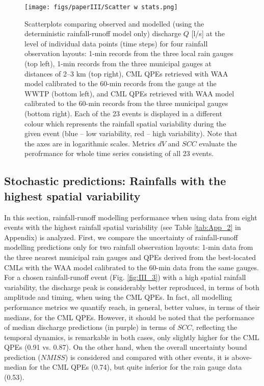 \documentclass{ctuthesis}\usepackage[]{graphicx}\usepackage[]{color}
\begin{document}
\begin{figure}[h]
\begin{center}
\texttt{[image: figs/paperIII/Scatter w stats.png]}
\caption{Scatterplots comparing observed and modelled (using the deterministic rainfall-runoff model only) discharge $Q$ [l/s] at the level of individual data points (time steps) for four rainfall observation layouts: 1-min records from the three local rain gauges (top left), 1-min records from the three municipal gauges at distances of 2--3 km (top right), CML QPEs retrieved with WAA model calibrated to the 60-min records from the gauge at the WWTP (bottom left), and CML QPEs retrieved with WAA model calibrated to the 60-min records from the three municipal gauges (bottom right). Each of the 23 events is displayed in a different colour which represents the rainfall spatial variability during the given event (blue – low variability, red – high variability). Note that the axes are in logarithmic scales. Metrics $dV$ and $SCC$ evaluate the perofrmance for whole time series consisting of all 23 events.} 
\label{fig:III_2}
\end{center}
\end{figure}

\FloatBarrier



\subsection{Stochastic predictions: Rainfalls with the highest spatial variability} \label{Summary_mostvar}

In this section, rainfall-runoff modelling performance when using data from eight events with the highest rainfall spatial variability (see Table \ref{tab:App_2} in Appendix) is analyzed. First, we compare the uncertainty of rainfall-runoff modelling predictions only for two rainfall observation layouts: 1-min data from the three nearest municipal rain gauges and QPEs derived from the best-located CMLs with the WAA model calibrated to the 60-min data from the same gauges. For a chosen rainfall-runoff event (Fig. \ref{fig:III_3}) with a high spatial rainfall variability, the discharge peak is considerably better reproduced, in terms of both amplitude and timing, when using the CML QPEs. In fact, all modelling performance metrics we quantify reach, in general, better values, in terms of their medians, for the CML QPEs. However, it should be noted that the performance of median discharge  predictions (in purple) in terms of $S\!C\!C$, reflecting the temporal dynamics, is remarkable in both cases, only slightly higher for the CML QPEs (0.91 vs. 0.87). On the other hand, when the overall uncertainty bound prediction ($N\!M\!I\!S\!S$) is considered and compared with other events, it is above-median for the CML QPEs (0.74), but quite inferior for the rain gauge data (0.53).  
\end{document}
